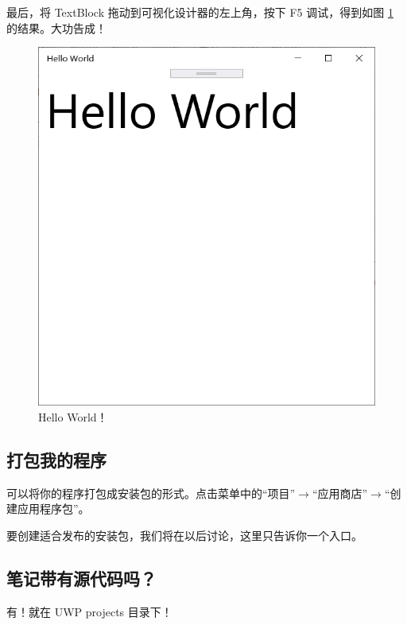 最后，将 TextBlock 拖动到可视化设计器的左上角，按下 F5 调试，得到如图 \ref{pic14} 的结果。大功告成！
\begin{figure}[htbp]
    \centering
    \includegraphics[width = 0.5\paperwidth]{pic/14.png}
    \caption{Hello World！}
    \label{pic14}
\end{figure}

\subsection{打包我的程序}

可以将你的程序打包成安装包的形式。点击菜单中的``项目''$\rightarrow$``应用商店''$\rightarrow$``创建应用程序包''。

要创建适合发布的安装包，我们将在以后讨论，这里只告诉你一个入口。

\subsection{笔记带有源代码吗？}

有！就在 UWP projects 目录下！